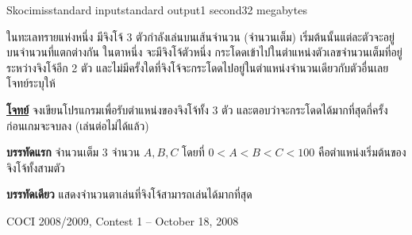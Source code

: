 \documentclass[11pt,a4paper]{article}
\begin{document}
\begin{problem}{Skocimis}{standard input}{standard output}{1 second}{32 megabytes}

ในทะเลทรายแห่งหนึ่ง มีจิงโจ้ 3 ตัวกำลังเล่นบนเส้นจำนวน (จำนวนเต็ม) เริ่มต้นนั้นแต่ละตัวจะอยู่บนจำนวนที่แตกต่างกัน ในตาหนึ่ง จะมีจิงโจ้ตัวหนึ่ง กระโดดเข้าไปในตำแหน่งตัวเลขจำนวนเต็มที่อยู่ระหว่างจิงโจ้อีก 2 ตัว และไม่มีครั้งใดที่จิงโจ้จะกระโดดไปอยู่ในตำแหน่งจำนวนเดียวกับตัวอื่นเลยโจทย์ระบุให้

\underline{\textbf{โจทย์}} จงเขียนโปรแกรมเพื่อรับตำแหน่งของจิงโจ้ทั้ง 3 ตัว และตอบว่าจะกระโดดได้มากที่สุดกี่ครั้ง ก่อนเกมจะจบลง (เล่นต่อไม่ได้แล้ว)

\InputFile

\textbf{บรรทัดแรก} จำนวนเต็ม 3 จำนวน $A, B, C$ โดยที่ $0 < A < B < C < 100$ คือตำแหน่งเริ่มต้นของจิงโจ้ทั้งสามตัว

\OutputFile

\textbf{บรรทัดเดียว} แสดงจำนวนตาเล่นที่จิงโจ้สามารถเล่นได้มากที่สุด

\Source

COCI 2008/2009, Contest 1 – October 18, 2008

\Examples

\begin{example}
%
%
\end{example}

\end{problem}
\end{document}
